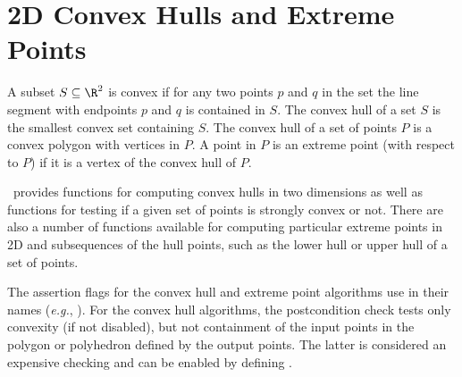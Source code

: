
\chapter{2D Convex Hulls and Extreme Points}
\label{chap:convex_hull_2_ref}


A subset $S \subseteq \R^2$ is convex if for any two points $p$ and $q$
in the set the line segment with endpoints $p$ and $q$ is contained
in $S$. The convex hull of a set $S$ is 
the smallest convex set containing
$S$. The convex hull of a set of points $P$ is a convex 
polygon with vertices in $P$.  A point in $P$ is an extreme point 
(with respect to $P$) if it is a vertex 
of the convex hull of $P$.

\cgal\ provides functions for computing convex hulls in two dimensions
as well as functions for testing if a given set of points is strongly 
convex or not.  There are also a number of functions available for computing 
particular extreme points in 2D and subsequences of the hull points, such as 
the lower hull or upper hull of a set of points.


The assertion flags for the convex hull and extreme point algorithms
use  in their names (\textit{e.g.}, ).
For the convex hull algorithms, the postcondition
check tests only convexity (if not disabled), but not containment of the
input points in the polygon or polyhedron defined by the output points.
The latter is considered an expensive checking and can be enabled by
defining %
.






